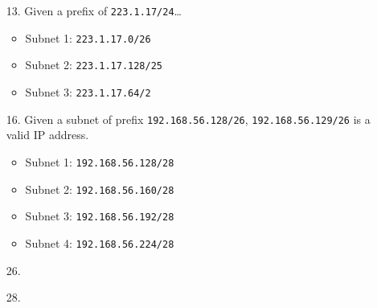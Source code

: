 \documentclass[11pt]{article}
\begin{document}
\begin{itemize}
  \item[13.] Given a prefix of \texttt{223.1.17/24}\ldots
    \begin{itemize}
      \item Subnet 1: \texttt{223.1.17.0/26}
      \item Subnet 2: \texttt{223.1.17.128/25}
      \item Subnet 3: \texttt{223.1.17.64/2}
    \end{itemize}

  \item[16.] Given a subnet of prefix \texttt{192.168.56.128/26},
    \texttt{192.168.56.129/26} is a valid IP address.
    \begin{itemize}
      \item Subnet 1: \texttt{192.168.56.128/28}
      \item Subnet 2: \texttt{192.168.56.160/28}
      \item Subnet 3: \texttt{192.168.56.192/28}
      \item Subnet 4: \texttt{192.168.56.224/28}
    \end{itemize}

  \item[26.]

  \item[28.]

\end{itemize}
\end{document}
